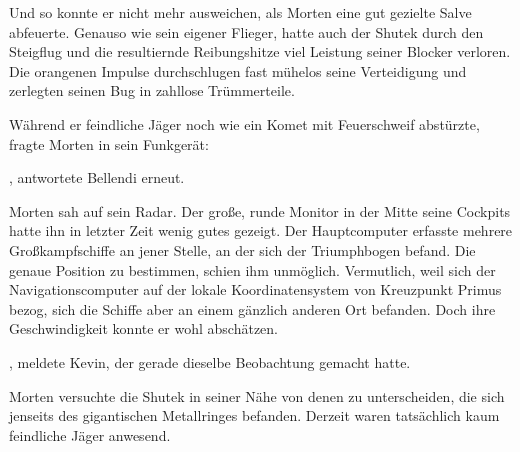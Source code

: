 \par

Und so konnte er nicht mehr ausweichen, als Morten eine gut gezielte Salve abfeuerte. Genauso wie sein eigener Flieger, hatte auch der Shutek durch den Steigflug und die resultiernde Reibungshitze viel Leistung seiner Blocker verloren. Die orangenen Impulse durchschlugen fast mühelos seine Verteidigung und zerlegten seinen Bug in zahllose Trümmerteile.

\par

Während er feindliche Jäger noch wie ein Komet mit Feuerschweif abstürzte, fragte Morten in sein Funkgerät: 

\par

, antwortete Bellendi erneut. 

\par

Morten sah auf sein Radar. Der große, runde Monitor in der Mitte seine Cockpits hatte ihn in letzter Zeit wenig gutes gezeigt. Der Hauptcomputer erfasste mehrere Großkampfschiffe an jener Stelle, an der sich der Triumphbogen befand. Die genaue Position zu bestimmen, schien ihm unmöglich. Vermutlich, weil sich der Navigationscomputer auf der lokale Koordinatensystem von Kreuzpunkt Primus bezog, sich die Schiffe aber an einem gänzlich anderen Ort befanden. Doch ihre Geschwindigkeit konnte er wohl abschätzen.

\par

, meldete Kevin, der gerade dieselbe Beobachtung gemacht hatte. 

\par

Morten versuchte die Shutek in seiner Nähe von denen zu unterscheiden, die sich jenseits des gigantischen Metallringes befanden. Derzeit waren tatsächlich kaum feindliche Jäger anwesend.

\par

